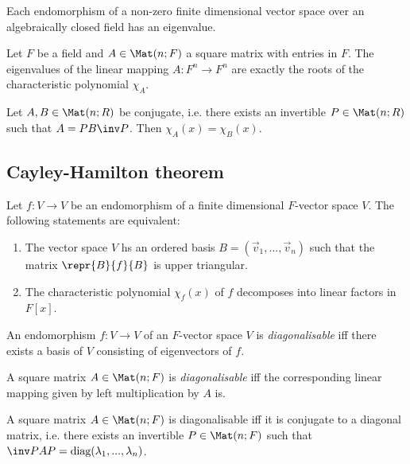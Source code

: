 \documentclass{article}
\begin{document}
\begin{theorem}[Theorem 4.5.4]
	Each endomorphism of a non-zero finite dimensional vector space over an algebraically closed field
	has an eigenvalue.
\end{theorem}

\begin{theorem}[Theorem 4.5.8]
	Let $F$ be a field and $A\in\Mat(n;F)$ a square matrix with entries in $F$. The eigenvalues of the
	linear mapping $A:F^n\to F^n$ are exactly the roots of the characteristic polynomial $\chi_A$.
\end{theorem}

\begin{lemma}
	Let $A,B\in\Mat(n; R)$ be conjugate, i.e. there exists an invertible $P\in\Mat(n; R)$ such that
	$A=PB\inv P$. Then $\chi_A(x)=\chi_B(x)$.
\end{lemma}

\subsection{Cayley-Hamilton theorem}

\begin{proposition}
	Let $f:V\to V$ be an endomorphism of a finite dimensional $F$-vector space $V$. The following
	statements are equivalent:
	\begin{enumerate}
		\item The vector space $V$ hs an ordered basis $B=(\vec v_1,...,\vec v_n)$ such that the matrix
		      $\repr{B}{f}{B}$ is upper triangular.
		\item The characteristic polynomial $\chi_f(x)$ of $f$ decomposes into linear factors in $F[x]$.
	\end{enumerate}
\end{proposition}

\begin{definition}
	An endomorphism $f:V\to V$ of an $F$-vector space $V$ is \emph{diagonalisable} iff there exists
	a basis of $V$ consisting of eigenvectors of $f$.

	A square matrix $A\in\Mat(n;F)$ is \emph{diagonalisable} iff the corresponding linear mapping
	given by left multiplication by $A$ is.
\end{definition}

\begin{theorem}
	A square matrix $A\in\Mat(n;F)$ is diagonalisable iff it is conjugate to a diagonal
	matrix, i.e. there exists an invertible $P\in\Mat(n;F)$ such that
	$\inv PAP=\text{diag}(\lambda_1,...,\lambda_n)$.
\end{theorem}
\end{document}
